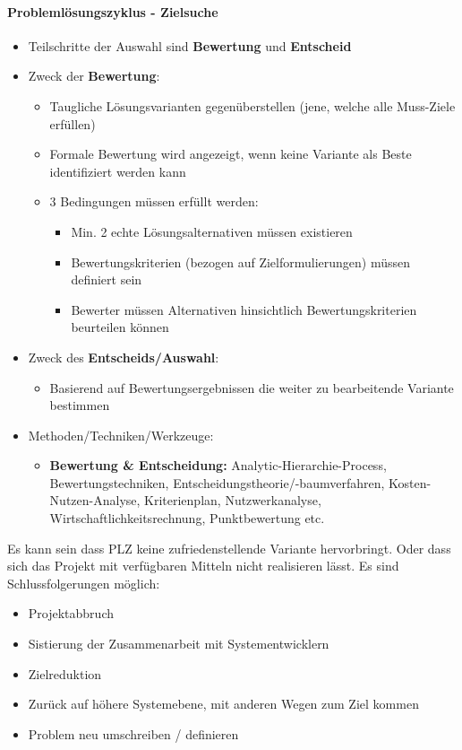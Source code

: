 \documentclass[a4paper]{article}
\begin{document}
		\paragraph{Problemlösungszyklus - Zielsuche}
		
			\begin{itemize}
				\item Teilschritte der Auswahl sind \textbf{Bewertung} und \textbf{Entscheid}
				\item Zweck der \textbf{Bewertung}:
					\begin{itemize}
						\item Taugliche Lösungsvarianten gegenüberstellen (jene, welche alle Muss-Ziele erfüllen)
						\item Formale Bewertung wird angezeigt, wenn keine Variante als Beste identifiziert werden kann
						\item 3 Bedingungen müssen erfüllt werden:
							\begin{itemize}
								\item Min. 2 echte Lösungsalternativen müssen existieren
								\item Bewertungskriterien (bezogen auf Zielformulierungen) müssen definiert sein
								\item Bewerter müssen Alternativen hinsichtlich Bewertungskriterien beurteilen können
							\end{itemize}
					\end{itemize}
				\item Zweck des \textbf{Entscheids/Auswahl}:
					\begin{itemize}
						\item Basierend auf Bewertungsergebnissen die weiter zu bearbeitende Variante bestimmen
					\end{itemize}
				\item Methoden/Techniken/Werkzeuge:
					\begin{itemize}
						\item \textbf{Bewertung \& Entscheidung:}
						Analytic-Hierarchie-Process, Bewertungstechniken, Entscheidungstheorie/-baumverfahren, Kosten-Nutzen-Analyse, Kriterienplan, Nutzwerkanalyse, Wirtschaftlichkeitsrechnung, Punktbewertung etc.
					\end{itemize}
			\end{itemize}
			\vspace{1em}
			Es kann sein dass PLZ keine zufriedenstellende Variante hervorbringt.
			Oder dass sich das Projekt mit verfügbaren Mitteln nicht realisieren lässt.
			Es sind Schlussfolgerungen möglich:\\
			\begin{itemize}
				\item Projektabbruch
				\item Sistierung der Zusammenarbeit mit Systementwicklern
				\item Zielreduktion
				\item Zurück auf höhere Systemebene, mit anderen Wegen zum Ziel kommen
				\item Problem neu umschreiben / definieren
			\end{itemize}
			
\end{document}
